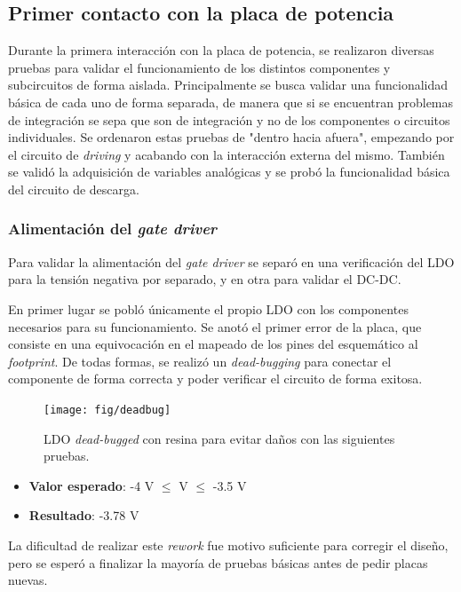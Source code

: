 \subsection{Primer contacto con la placa de potencia}

Durante la primera interacción con la placa de potencia, se realizaron diversas pruebas para validar el funcionamiento de los distintos componentes y subcircuitos de forma aislada. Principalmente se busca validar una funcionalidad básica de cada uno de forma separada, de manera que si se encuentran problemas de integración se sepa que son de integración y no de los componentes o circuitos individuales. Se ordenaron estas pruebas de "dentro hacia afuera", empezando por el circuito de \textit{driving} y acabando con la interacción externa del mismo. También se validó la adquisición de variables analógicas y se probó la funcionalidad básica del circuito de descarga.


\subsubsection{Alimentación del \textit{gate driver}}

Para validar la alimentación del \textit{gate driver} se separó en una verificación del LDO para la tensión negativa por separado, y en otra para validar el DC-DC.

En primer lugar se pobló únicamente el propio LDO con los componentes necesarios para su funcionamiento. Se anotó el primer error de la placa, que consiste en una equivocación en el mapeado de los pines del esquemático al \textit{footprint}. De todas formas, se realizó un \textit{dead-bugging} para conectar el componente de forma correcta y poder verificar el circuito de forma exitosa.

\begin{figure}[H]
	\centering
	\texttt{[image: fig/deadbug]}
	\caption{LDO \textit{dead-bugged} con resina para evitar daños con las siguientes pruebas.}
\end{figure}

\begin{itemize}
	\item \textbf{Valor esperado}: -4 V $\le$ V $\le$ -3.5 V
	\item \textbf{Resultado}: -3.78 V
\end{itemize}


La dificultad de realizar este \textit{rework} fue motivo suficiente para corregir el diseño, pero se esperó a finalizar la mayoría de pruebas básicas antes de pedir placas nuevas.

